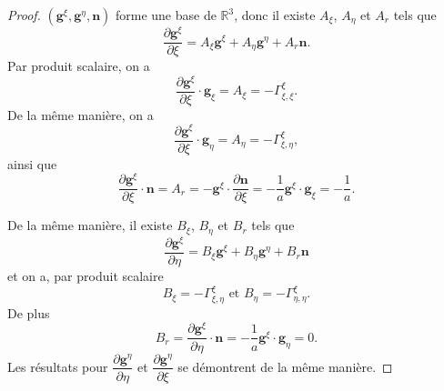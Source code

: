 \begin{proof}
$(\mathbf{g}^{\xi}, \mathbf{g}^{\eta}, \mathbf{n})$ forme une base de $\mathbb{R}^3$, donc il existe $A_{\xi}$, $A_{\eta}$ et $A_r$ tels que 
\begin{equation}
\dfrac{\partial \mathbf{g}^{\xi}}{\partial \xi} = A_{\xi} \mathbf{g}^{\xi} + A_{\eta} \mathbf{g}^{\eta} + A_r \mathbf{n}.
\end{equation}
Par produit scalaire, on a 
\begin{equation}
\dfrac{\partial \mathbf{g}^{\xi}}{\partial \xi} \cdot \mathbf{g}_{\xi} = A_{\xi} = - \Gamma_{\xi, \xi}^{\xi}.
\end{equation}
De la même manière, on a 
\begin{equation}
\dfrac{\partial \mathbf{g}^{\xi}}{\partial \xi} \cdot \mathbf{g}_{\eta} = A_{\eta} = - \Gamma_{\xi, \eta}^{\xi},
\end{equation}
ainsi que
\begin{equation}
\dfrac{\partial \mathbf{g}^{\xi}}{\partial \xi} \cdot \mathbf{n} = A_r = - \mathbf{g}^{\xi} \cdot \dfrac{\partial \mathbf{n}}{\partial \xi} = - \dfrac{1}{a} \mathbf{g}^{\xi} \cdot \mathbf{g}_{\xi} = -\dfrac{1}{a}.
\end{equation}

De la même manière, il existe $B_{\xi}$, $B_{\eta}$ et $B_r$ tels que
\begin{equation}
\dfrac{\partial \mathbf{g}^{\xi}}{\partial \eta} = B_{\xi} \mathbf{g}^{\xi} + B_{\eta} \mathbf{g}^{\eta} + B_r \mathbf{n}
\end{equation}
et on a, par produit scalaire
\begin{equation}
B_{\xi} = - \Gamma_{\xi, \eta}^{\xi} \text{ et } B_{\eta} = - \Gamma_{\eta, \eta}^{\xi}.
\end{equation}
De plus
\begin{equation}
B_r = \dfrac{\partial \mathbf{g}^{\xi}}{\partial \eta} \cdot \mathbf{n} = - \dfrac{1}{a} \mathbf{g}^{\xi} \cdot \mathbf{g}_{\eta} = 0.
\end{equation}
Les résultats pour $\dfrac{\partial \mathbf{g}^{\eta}}{\partial \eta}$ et $\dfrac{\partial \mathbf{g}^{\eta}}{\partial \xi}$ se démontrent de la même manière.
\end{proof}


